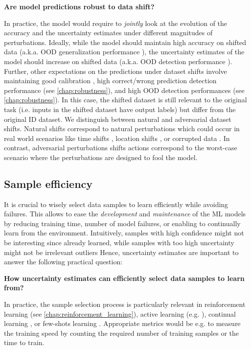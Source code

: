 \begin{center}
    \textbf{Are model predictions robust to data shift?}
\end{center}

In practice, the model would require to \emph{jointly} look at the evolution of the accuracy and the uncertainty estimates under different magnitudes of perturbations. Ideally, while the model should maintain high accuracy on shifted data (a.k.a. OOD generalization performance \cite{ood-generalization-survey}), the uncertainty estimates of the model should increase on shifted data (a.k.a. OOD detection performance \cite{ood-detection-survey}). Further, other expectations on the predictions under dataset shifts involve maintaining good calibration \cite{dataset-shift}, high correct/wrong prediction detection performance (see \cref{chap:robustness}), and high OOD detection performances (see \cref{chap:robustness}). In this case, the shifted dataset is still relevant to the original task (i.e. inputs in the shifted dataset have output labels) but differ from the original ID dataset. We distinguish between natural and adversarial dataset shifts. Natural shifts correspond to natural perturbations which could occur in real world scenarios like time shifts \cite{wilds, neuhold201mapillary, shifts-dataset}, location shifts \cite{wilds, neuhold201mapillary, shifts-dataset}, or corrupted data \cite{benchmarking-corruptions, taori2020shift}. In contrast, adversarial perturbations shifts actions correspond to the worst-case scenario where the perturbations are designed to fool the model.

\subsection{Sample efficiency}

It is crucial to wisely select data samples to learn efficiently while avoiding failures. This allows to ease the \emph{development} and \emph{maintenance} of the ML models by reducing training time, number of model failures, or enabling to continually learn from the environment. Intuitively, samples with high confidence might not be interesting since already learned, while samples with too high uncertainty might not be irrelevant outliers Hence, uncertainty estimates are important to answer the following practical question:

\begin{center}
    \textbf{How uncertainty estimates can efficiently select data samples to learn from?}
\end{center}

In practice, the sample selection process is particularly relevant in reinforcement learning (see \cref{chap:reinforcement_learning}), active learning (e.g. \cite{gal2017bald, kirsch2019batch}), continual learning \cite{hsu2018continual, lin2021clear}, or few-shots learning \cite{antoniou2020fewshots}. Appropriate metrics would be e.g. to measure the training speed by counting the required number of training samples or the time to train.
